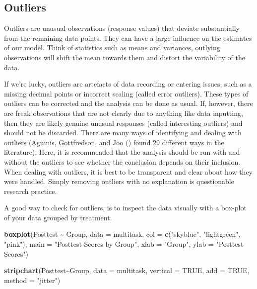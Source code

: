 \documentclass[
  letterpaper,
]{book}
\newenvironment{Shaded}{\begin{snugshade}}{\end{snugshade}}
\newcommand{\AttributeTok}[1]{\textcolor[rgb]{0.13,0.29,0.53}{#1}}
\newcommand{\ConstantTok}[1]{\textcolor[rgb]{0.56,0.35,0.01}{#1}}
\newcommand{\FunctionTok}[1]{\textcolor[rgb]{0.13,0.29,0.53}{\textbf{#1}}}
\newcommand{\NormalTok}[1]{#1}
\newcommand{\SpecialCharTok}[1]{\textcolor[rgb]{0.81,0.36,0.00}{\textbf{#1}}}
\newcommand{\StringTok}[1]{\textcolor[rgb]{0.31,0.60,0.02}{#1}}
\begin{document}
\subsection*{Outliers}\label{outliers}

Outliers are unusual observations (response values) that deviate
substantially from the remaining data points. They can have a large
influence on the estimates of our model. Think of statistics such as
means and variances, outlying observations will shift the mean towards
them and distort the variability of the data.

If we're lucky, outliers are artefacts of data recording or entering
issues, such as a missing decimal points or incorrect scaling (called
error outliers). These types of outliers can be corrected and the
analysis can be done as usual. If, however, there are freak observations
that are not clearly due to anything like data inputting, then they are
likely genuine unusual responses (called interesting outliers) and
should not be discarded. There are many ways of identifying and dealing
with outliers (Aguinis, Gottfredson, and Joo
() found 29 different ways in the
literature). Here, it is recommended that the analysis should be run
with and without the outliers to see whether the conclusion depends on
their inclusion. When dealing with outliers, it is best to be
transparent and clear about how they were handled. Simply removing
outliers with no explanation is questionable research practice.

A good way to check for outliers, is to inspect the data visually with a
box-plot of your data grouped by treatment.

\begin{Shaded}
\begin{Highlighting}[]
\FunctionTok{boxplot}\NormalTok{(Posttest }\SpecialCharTok{\textasciitilde{}}\NormalTok{ Group, }\AttributeTok{data =}\NormalTok{ multitask, }\AttributeTok{col =} \FunctionTok{c}\NormalTok{(}\StringTok{"skyblue"}\NormalTok{, }\StringTok{"lightgreen"}\NormalTok{, }\StringTok{"pink"}\NormalTok{), }
        \AttributeTok{main =} \StringTok{"Posttest Scores by Group"}\NormalTok{, }
        \AttributeTok{xlab =} \StringTok{"Group"}\NormalTok{, }
        \AttributeTok{ylab =} \StringTok{"Posttest Scores"}\NormalTok{)}

\FunctionTok{stripchart}\NormalTok{(Posttest}\SpecialCharTok{\textasciitilde{}}\NormalTok{Group, }\AttributeTok{data =}\NormalTok{ multitask, }\AttributeTok{vertical =} \ConstantTok{TRUE}\NormalTok{, }\AttributeTok{add =} \ConstantTok{TRUE}\NormalTok{, }\AttributeTok{method =} \StringTok{"jitter"}\NormalTok{)}
\end{Highlighting}
\end{Shaded}
\end{document}
